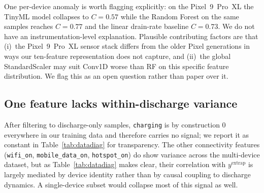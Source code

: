\documentclass[conference]{IEEEtran}
\begin{document}
One per-device anomaly is worth flagging explicitly:
on the Pixel~9~Pro~XL the TinyML model collapses to $C{=}0.57$
while the Random Forest on the same samples reaches $C{=}0.77$ and
the linear drain-rate baseline $C{=}0.73$. We do not have an
instrumentation-level explanation. Plausible contributing factors
are that (i)~the Pixel~9~Pro~XL sensor stack differs from the older
Pixel generations in ways our ten-feature representation does not
capture, and (ii)~the global StandardScaler may suit Conv1D worse
than RF on this specific feature distribution. We flag this as an
open question rather than paper over it.

\subsection{One feature lacks within-discharge variance}
After filtering to discharge-only samples, \texttt{charging} is by
construction $0$ everywhere in our training data and therefore carries
no signal; we report it as constant in Table~\ref{tab:datadiag} for
transparency. The other connectivity features (\texttt{wifi\_on},
\texttt{mobile\_data\_on}, \texttt{hotspot\_on}) do show variance
across the multi-device dataset, but as Table~\ref{tab:datadiag}
makes clear, their correlation with $y^{\text{extrap}}$ is largely
mediated by device identity rather than by causal coupling to
discharge dynamics. A single-device subset would collapse most of
this signal as well.
\end{document}
